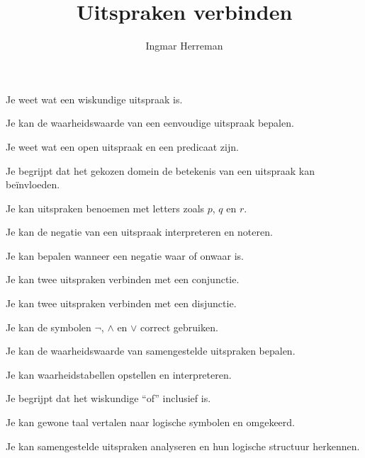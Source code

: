 \documentclass{ximera}
\title{Uitspraken verbinden}
\author{Ingmar Herreman}
\begin{document}













  \maketitle



  \begin{voorkennis}
    \item Je weet wat een wiskundige uitspraak is.
    \item Je kan de waarheidswaarde van een eenvoudige uitspraak bepalen.
    \item Je weet wat een open uitspraak en een predicaat zijn.
    \item Je begrijpt dat het gekozen domein de betekenis van een uitspraak kan beïnvloeden.
    \item Je kan uitspraken benoemen met letters zoals $p$, $q$ en $r$.
  \end{voorkennis}



  \begin{leerdoelen}
    \item Je kan de negatie van een uitspraak interpreteren en noteren.
    \item Je kan bepalen wanneer een negatie waar of onwaar is.
    \item Je kan twee uitspraken verbinden met een conjunctie.
    \item Je kan twee uitspraken verbinden met een disjunctie.
    \item Je kan de symbolen $\neg$, $\land$ en $\lor$ correct gebruiken.
    \item Je kan de waarheidswaarde van samengestelde uitspraken bepalen.
    \item Je kan waarheidstabellen opstellen en interpreteren.
    \item Je begrijpt dat het wiskundige ``of'' inclusief is.
    \item Je kan gewone taal vertalen naar logische symbolen en omgekeerd.
    \item Je kan samengestelde uitspraken analyseren en hun logische structuur herkennen.
  \end{leerdoelen}
\end{document}
